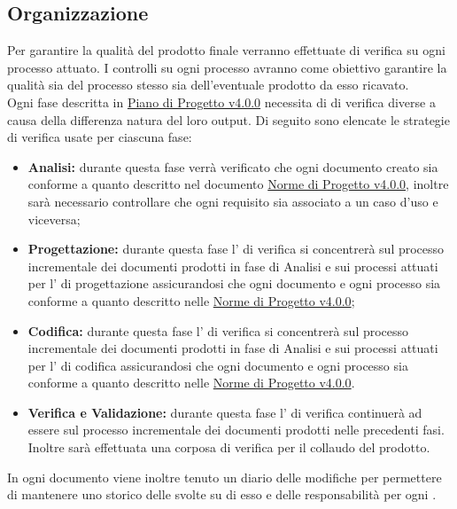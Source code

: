 \documentclass{scalatekids-article}
\begin{document}
\subsection{Organizzazione}
Per garantire la qualità del prodotto finale verranno effettuate  di verifica su ogni processo attuato. I controlli su ogni processo avranno come obiettivo garantire la qualità sia del processo stesso sia dell'eventuale prodotto da esso ricavato.\\
Ogni fase descritta in \href{run:./PianoDiProgetto\_v4.0.0.pdf}{Piano di Progetto v4.0.0} necessita di  di verifica diverse a causa della differenza natura del loro output. Di seguito sono elencate le strategie di verifica usate per ciascuna fase:
\begin{itemize}
\item\textbf{Analisi:} durante questa fase verrà verificato che ogni documento creato sia conforme a quanto descritto nel documento \href{run:../Interni/NormeDiProgetto\_v4.0.0.pdf}{Norme di Progetto v4.0.0}, inoltre sarà necessario controllare che ogni requisito sia associato a un caso d'uso e viceversa;
\item\textbf{Progettazione:} durante questa fase l' di verifica si concentrerà sul processo incrementale dei documenti prodotti in fase di Analisi e sui processi attuati per l' di progettazione assicurandosi che ogni documento e ogni processo sia conforme a quanto descritto nelle \href{run:../Interni/NormeDiProgetto\_v4.0.0.pdf}{Norme di Progetto v4.0.0};
\item\textbf{Codifica:} durante questa fase l' di verifica si concentrerà sul processo incrementale dei documenti prodotti in fase di Analisi e sui processi attuati per l' di codifica assicurandosi che ogni documento e ogni processo sia conforme a quanto descritto nelle \href{run:../Interni/NormeDiProgetto\_v4.0.0.pdf}{Norme di Progetto v4.0.0}.
\item\textbf{Verifica e Validazione:} durante questa fase l' di verifica continuerà ad essere sul processo incrementale dei documenti prodotti nelle precedenti fasi. Inoltre sarà effettuata una corposa  di verifica per il collaudo del prodotto.
\end{itemize}
In ogni documento viene inoltre tenuto un diario delle modifiche per permettere di mantenere uno storico delle  svolte su di esso e delle responsabilità per ogni .
\end{document}
